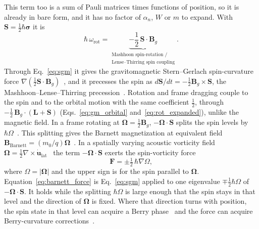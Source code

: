 \documentclass[aps,prd,onecolumn,tightenlines,nofootinbib,notitlepage,11pt,floatfix]{revtex4-2}
\theoremstyle{indentedtheorem}
\begin{document}
This term too is a sum of Pauli matrices times functions of position, so it is already in bare form, and it has no factor of $\alpha_n$, $W$ or $m$ to expand. With $\mathbf{S}=\tfrac{1}{2}\hbar\boldsymbol{\sigma}$ it is
\begin{equation}
    \hbar\,\omega_\text{rot} = \underbrace{-\frac{1}{2}\,\mathbf{S}\cdot\mathbf{B}_g}_{\substack{\text{Mashhoon spin-rotation /} \\ \text{Lense--Thirring spin coupling}}} .
    \label{eq:rot_expanded}
\end{equation}
Through Eq.~\eqref{eq:sgm} it gives the gravitomagnetic Stern--Gerlach spin-curvature force $\nabla(\tfrac{1}{2}\mathbf{S}\cdot\mathbf{B}_g)$~\citep{Mashhoon1988Neutron,ObukhovSilenkoTeryaev2013Spin}, and it precesses the spin as $d\mathbf{S}/dt=-\tfrac{1}{2}\mathbf{B}_g\times\mathbf{S}$, the Mashhoon--Lense--Thirring precession~\citep{Mashhoon1988Neutron,Everitt2011Gravity}. Rotation and frame dragging couple to the spin and to the orbital motion with the same coefficient $\tfrac{1}{2}$, through $-\tfrac{1}{2}\,\mathbf{B}_g\cdot(\mathbf{L}+\mathbf{S})$ (Eqs.~\eqref{eq:gm_orbital} and~\eqref{eq:rot_expanded}), unlike the magnetic field. In a frame rotating at $\boldsymbol{\Omega}=\tfrac{1}{2}\mathbf{B}_g$, $-\boldsymbol{\Omega}\cdot\mathbf{S}$ splits the spin levels by $\hbar\Omega$~\citep{Demirel2015Measurement,Danner2020Spin}. This splitting gives the Barnett magnetization at equivalent field $\mathbf{B}_\text{Barnett}=(m_0/q)\boldsymbol{\Omega}$~\citep{Barnett1915}. In a spatially varying acoustic vorticity field $\boldsymbol{\Omega}=\tfrac{1}{2}\nabla\times\dot{\mathbf{u}}_\text{lat}$~\citep{Matsuo2013Mechanical} the term $-\boldsymbol{\Omega}\cdot\mathbf{S}$ exerts the spin-vorticity force
\begin{equation}
    \mathbf{F} = \pm\tfrac{1}{2}\,\hbar\nabla\Omega ,
    \label{eq:barnett_force}
\end{equation}
where $\Omega=|\boldsymbol{\Omega}|$ and the upper sign is for the spin parallel to $\boldsymbol{\Omega}$. Equation~\eqref{eq:barnett_force} is Eq.~\eqref{eq:sgm} applied to one eigenvalue $\mp\tfrac{1}{2}\hbar\Omega$ of $-\boldsymbol{\Omega}\cdot\mathbf{S}$. It holds while the splitting $\hbar\Omega$ is large enough that the spin stays in that level and the direction of $\boldsymbol{\Omega}$ is fixed. Where that direction turns with position, the spin state in that level can acquire a Berry phase~\citep{Berry1984Quantal} and the force can acquire Berry-curvature corrections~\citep{Sundaram1999Wave}.
\end{document}
